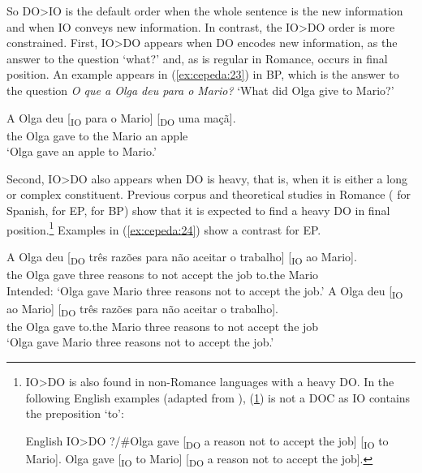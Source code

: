 \documentclass[output=paper,colorlinks,citecolor=brown,modfonts,nonflat]{langsci/langscibook}
\begin{document}
So DO>IO is the default order when the whole sentence is the new information and when IO conveys new information. In contrast, the IO>DO order is more constrained. First, IO>DO appears when DO encodes new information, as the answer to the question ‘what?’ and, as is regular in Romance, occurs in final position. An example appears in (\ref{ex:cepeda:23}) in BP, which is the answer to the question \textit{O que a Olga deu para o Mario?} ‘What did Olga give to Mario?’

\ea%
    \label{ex:cepeda:23}
	\gll A   Olga deu [\textsubscript{IO} para o   Mario] [\textsubscript{DO} uma maçã].\\
		the Olga gave \hspaceThis{[\textsubscript{IO}} to the Mario  \hspaceThis{[\textsubscript{DO}} an apple\\
	\glt ‘Olga gave an apple to Mario.’
\z

Second, IO>DO also appears when DO is heavy, that is, when it is either a long or complex constituent. Previous corpus and theoretical studies in Romance (\citealt{BeaversNishida2010} for Spanish, \citealt{Brito2014} for EP, \citealt{Mioto2003} for BP) show that it is expected to find a heavy DO in final position.\footnote{IO>DO is also found in non-Romance languages with a heavy DO. In the following English examples (adapted from \citealt{Larson2014}), (\ref{ex:cepeda:ib}) is not a DOC as IO contains the preposition ‘to’:

\ea%
    \label{ex:cepeda:i}
    English IO>DO
	\ea\label{ex:cepeda:ia} {?/\#}Olga gave [\textsubscript{DO} a reason not to accept the job] [\textsubscript{IO} to Mario].
	\ex\label{ex:cepeda:ib} Olga gave [\textsubscript{IO} to Mario] [\textsubscript{DO} a reason not to accept the job].
	\z
\z
} Examples in (\ref{ex:cepeda:24}) show a contrast for EP.

\ea%
    \label{ex:cepeda:24}
	\ea\label{ex:cepeda:24a}
	A Olga deu [\textsubscript{DO}  três razões para não aceitar o trabalho] [\textsubscript{IO} ao Mario].\\
		the Olga gave \hspaceThis{[\textsubscript{DO}} three reasons to not accept the job \hspaceThis{[\textsubscript{IO}} to.the Mario\\
	\glt Intended: ‘Olga gave Mario three reasons not to accept the job.’
	\ex\label{ex:cepeda:24b}
	\gll A Olga deu [\textsubscript{IO} ao Mario] [\textsubscript{DO} três razões para não aceitar o trabalho].\\
		the Olga gave \hspaceThis{[\textsubscript{IO}} to.the Mario \hspaceThis{[\textsubscript{DO}} three reasons to not accept the job\\
	\glt ‘Olga gave Mario three reasons not to accept the job.’
	\z
\z
\end{document}
